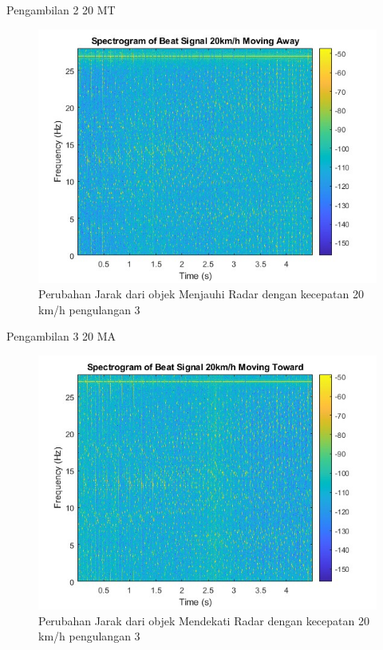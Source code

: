 Pengambilan 2 20 MT

\begin{figure}
	\centering
	\includegraphics[scale=0.6]{pics/bab5/Velocity/3_20MA.jpg}
	\caption{Perubahan Jarak dari objek Menjauhi Radar dengan kecepatan 20 km/h pengulangan 3}
	\label{fig:pengambilan3_20MA}
\end{figure}

Pengambilan 3 20 MA

\begin{figure}
	\centering
	\includegraphics[scale=0.6]{pics/bab5/Velocity/3_20MT.jpg}
	\caption{Perubahan Jarak dari objek Mendekati Radar dengan kecepatan 20 km/h pengulangan 3}
	\label{fig:pengambilan3_20MT}
\end{figure}

